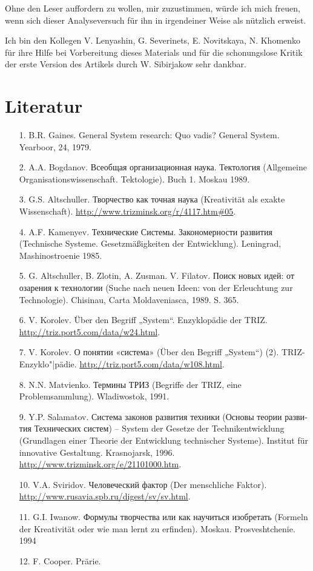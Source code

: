 \documentclass[11pt,a4paper]{article}
\begin{document}
Ohne den Leser auffordern zu wollen, mir zuzustimmen, würde ich mich freuen,
wenn sich dieser Analyseversuch für ihn in irgendeiner Weise als nützlich
erweist.

Ich bin den Kollegen V. Lenyashin, G. Severinets, E. Novitskaya, N. Khomenko
für ihre Hilfe bei Vorbereitung dieses Materials und für die schonungslose
Kritik der erste Version des Artikels durch W. Sibirjakow sehr dankbar.

\section*{Literatur}
\begin{itemize}
\item[1.] B.R. Gaines. General System research: Quo vadis? General System.
  Yearboor, 24, 1979.
\item[2.] A.A. Bogdanov. \foreignlanguage{russian}{Всеобщая организационная
  наука. Тектология} (Allgemeine Organisationswissenschaft. Tektologie). Buch
  1.  Moskau 1989.
\item[3.] G.S. Altschuller. \foreignlanguage{russian}{Творчество как точная
  наука} (Kreativität als exakte Wissenschaft).
  \url{http://www.trizminsk.org/r/4117.htm#05}.
\item[4.] A.F. Kamenyev. \foreignlanguage{russian}{Технические
  Системы. Закономерности развития} (Technische Systeme. Gesetzmäßigkeiten der
  Entwicklung).  Leningrad, Mashinostroenie 1985.
\item[5.] G. Altschuller, B. Zlotin, A. Zusman. V. Filatov.
  \foreignlanguage{russian}{Поиск новых идей: от озарения к технологии} (Suche
  nach neuen Ideen: von der Erleuchtung zur Technologie). Chisinau, Carta
  Moldaveniasca, 1989. S. 365.
\item[6.] V. Korolev. Über den Begriff „System“. Enzyklopädie der TRIZ.
 \url{http://triz.port5.com/data/w24.html}.
\item[7.] V. Korolev. \foreignlanguage{russian}{О понятии «система»} (Über den
  Begriff „System“) (2).  TRIZ-Enzyklo"|pädie.
  \url{http://triz.port5.com/data/w108.html}.
\item[8.] N.N. Matvienko. \foreignlanguage{russian}{Термины ТРИЗ} (Begriffe
  der TRIZ, eine Problemsammlung). Wladiwostok, 1991.
\item[9.] Y.P. Salamatov. \foreignlanguage{russian}{Система законов развития
  техники (Основы теории развития Технических систем)} -- System der Gesetze
  der Technikentwicklung (Grundlagen einer Theorie der Entwicklung technischer
  Systeme). Institut für innovative Gestaltung. Krasnojarsk, 1996.
  \url{http://www.trizminsk.org/e/21101000.htm}.
\item[10.] V.A. Sviridov. \foreignlanguage{russian}{Человеческий фактор} (Der
  menschliche Faktor).  \url{http://www.rusavia.spb.ru/digest/sv/sv.html}.
\item[11.] G.I. Iwanow. \foreignlanguage{russian}{Формулы творчества или как
  научиться изобретать} (Formeln der Kreativität oder wie man lernt zu
  erfinden).  Moskau. Prosveshtchenie. 1994
\item[12.] F. Cooper. Prärie. 
\end{itemize}
\end{document}
